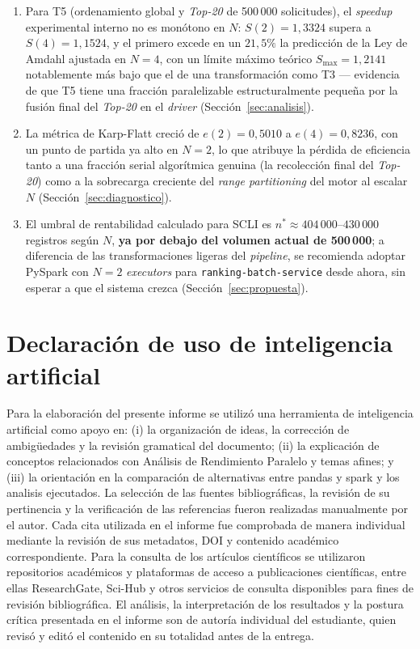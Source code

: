 \documentclass[10pt,conference]{IEEEtran}
\begin{document}
\begin{enumerate}
  \item Para T5 (ordenamiento global y \textit{Top-20} de 500\,000 solicitudes), el \textit{speedup} experimental interno no es monótono en $N$: $S(2)=1{,}3324$ supera a $S(4)=1{,}1524$, y el primero excede en un $21{,}5\%$ la predicción de la Ley de Amdahl ajustada en $N=4$, con un límite máximo teórico $S_{\max}=1{,}2141$ notablemente más bajo que el de una transformación como T3 --- evidencia de que T5 tiene una fracción paralelizable estructuralmente pequeña por la fusión final del \textit{Top-20} en el \textit{driver} (Sección~\ref{sec:analisis}).
  \item La métrica de Karp-Flatt creció de $e(2)=0{,}5010$ a $e(4)=0{,}8236$, con un punto de partida ya alto en $N=2$, lo que atribuye la pérdida de eficiencia tanto a una fracción serial algorítmica genuina (la recolección final del \textit{Top-20}) como a la sobrecarga creciente del \textit{range partitioning} del motor al escalar $N$ (Sección~\ref{sec:diagnostico}).
  \item El umbral de rentabilidad calculado para SCLI es $n^{*}\approx404\,000$--$430\,000$ registros según $N$, \textbf{ya por debajo del volumen actual de 500\,000}; a diferencia de las transformaciones ligeras del \textit{pipeline}, se recomienda adoptar PySpark con $N=2$ \textit{executors} para \texttt{ranking-batch-service} desde ahora, sin esperar a que el sistema crezca (Sección~\ref{sec:propuesta}).
\end{enumerate}

\section*{Declaración de uso de inteligencia artificial }
Para la elaboración del presente informe se utilizó una herramienta de inteligencia artificial como apoyo en: (i) la organización de ideas, la corrección de ambigüedades y la revisión gramatical del documento; (ii) la explicación de conceptos relacionados con Análisis de Rendimiento Paralelo y temas afines; y (iii) la orientación en la comparación de alternativas entre pandas y spark y los analisis ejecutados. La selección de las fuentes bibliográficas, la revisión de su pertinencia y la verificación de las referencias fueron realizadas manualmente por el autor. Cada cita utilizada en el informe fue comprobada de manera individual mediante la revisión de sus metadatos, DOI y contenido académico correspondiente. Para la consulta de los artículos científicos se utilizaron repositorios académicos y plataformas de acceso a publicaciones científicas, entre ellas ResearchGate, Sci-Hub y otros servicios de consulta disponibles para fines de revisión bibliográfica. El análisis, la interpretación de los resultados y la postura crítica presentada en el informe son de autoría individual del estudiante, quien revisó y editó el contenido en su totalidad antes de la entrega.

\printbibliography
\end{document}
